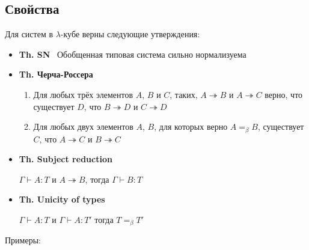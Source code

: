 \subsection{Свойства}

Для систем в $\lambda$-кубе верны следующие утверждения:
\begin{itemize}
    \item \textbf{Th. SN} \qquad \qquad \qquad \quad \quad \ Обобщенная типовая система сильно нормализуема
    \item \textbf{Th. Черча-Россера} \quad \begin{minipage}{0.6\textwidth}
\raggedright %
\begin{enumerate}
    \item Для любых трёх элементов $A$, $B$ и $C$, таких, 
    $A \twoheadrightarrow B$ и $A \twoheadrightarrow C$ верно,
    что существует $D$, что 
    $B \twoheadrightarrow D$ и $C \twoheadrightarrow D$
    \item Для любых двух элементов $A$, $B$, для которых верно $A =_\beta B$, 
    существует $C$, что $A \twoheadrightarrow C$ и $B \twoheadrightarrow C$
\end{enumerate}
\end{minipage}
    \item \textbf{Th. Subject reduction} \quad \begin{minipage}{0.6\textwidth}
\raggedright %
    $\Gamma \vdash A : T$ и $A \twoheadrightarrow B$, тогда $\Gamma \vdash B : T$ 
\end{minipage}
    \item \textbf{Th. Unicity of types} \quad \ \  \begin{minipage}{0.6\textwidth}
\raggedright %
    $\Gamma \vdash A : T$ и $\Gamma \vdash A : T'$ тогда $T =_\beta T'$ 
\end{minipage}
\end{itemize}


\vspace{5mm}   

Примеры:

